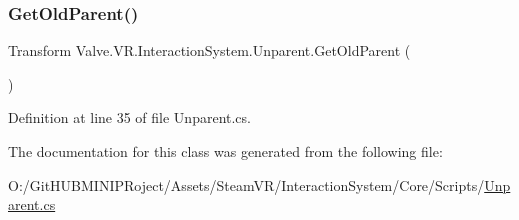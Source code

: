 \subsubsection{\texorpdfstring{GetOldParent()}{GetOldParent()}}
{\footnotesize\ttfamily Transform Valve.\+V\+R.\+Interaction\+System.\+Unparent.\+Get\+Old\+Parent (\begin{DoxyParamCaption}{ }\end{DoxyParamCaption})}



Definition at line 35 of file Unparent.\+cs.



The documentation for this class was generated from the following file\+:\begin{DoxyCompactItemize}
\item 
O\+:/\+Git\+H\+U\+B\+M\+I\+N\+I\+P\+Roject/\+Assets/\+Steam\+V\+R/\+Interaction\+System/\+Core/\+Scripts/\mbox{\hyperlink{_unparent_8cs}{Unparent.\+cs}}\end{DoxyCompactItemize}
